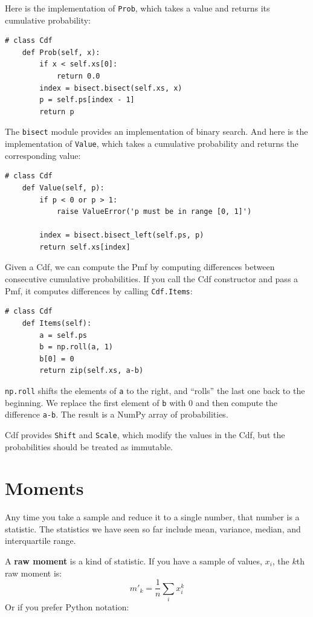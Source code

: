 \documentclass[12pt]{book}
\theoremstyle{exercise}
\begin{document}
Here is the implementation of {\tt Prob}, which takes a value
and returns its cumulative probability: 

\begin{verbatim}
# class Cdf
    def Prob(self, x):
        if x < self.xs[0]:
            return 0.0
        index = bisect.bisect(self.xs, x)
        p = self.ps[index - 1]
        return p
\end{verbatim}

The {\tt bisect} module provides an implementation of binary search.
And here is the implementation of {\tt Value}, which takes a
cumulative probability and returns the corresponding value:

\begin{verbatim}
# class Cdf
    def Value(self, p):
        if p < 0 or p > 1:
            raise ValueError('p must be in range [0, 1]')

        index = bisect.bisect_left(self.ps, p)
        return self.xs[index]
\end{verbatim}

Given a Cdf, we can compute the Pmf by computing differences between
consecutive cumulative probabilities.  If you call the Cdf constructor
and pass a Pmf, it computes differences by calling {\tt Cdf.Items}:%
%

\begin{verbatim}
# class Cdf
    def Items(self):
        a = self.ps
        b = np.roll(a, 1)
        b[0] = 0
        return zip(self.xs, a-b)
\end{verbatim}

{\tt np.roll} shifts the elements of {\tt a} to the right, and ``rolls''
the last one back to the beginning.  We replace the first element of
{\tt b} with 0 and then compute the difference {\tt a-b}.  The result
is a NumPy array of probabilities.%

Cdf provides {\tt Shift} and {\tt Scale}, which modify the
values in the Cdf, but the probabilities should be treated as
immutable.


\section{Moments}%

Any time you take a sample and reduce it to a single number, that
number is a statistic.  The statistics we have seen so far include
mean, variance, median, and interquartile range.

A {\bf raw moment} is a kind of statistic.  If you have a sample of
values, $x_i$, the $k$th raw moment is:
%
\[ m'_k = \frac{1}{n} \sum_i x_i^k \]
%
Or if you prefer Python notation:
\end{document}
